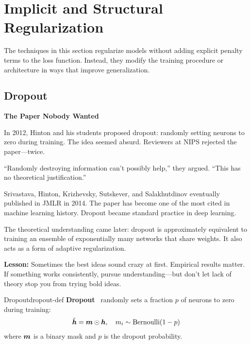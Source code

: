 \documentclass[../../main.tex]{subfiles}
\begin{document}
\section{Implicit and Structural Regularization}
\label{sec:implicit-structural}

The techniques in this section regularize models without adding explicit penalty terms to the loss function. Instead, they modify the training procedure or architecture in ways that improve generalization.

\subsection{Dropout}
\label{sec:dropout}

\begin{warstory}
\textbf{The Paper Nobody Wanted}

In 2012, Hinton and his students proposed dropout: randomly setting neurons to zero during training. The idea seemed absurd. Reviewers at NIPS rejected the paper---twice.

``Randomly destroying information can't possibly help,'' they argued. ``This has no theoretical justification.''

Srivastava, Hinton, Krizhevsky, Sutskever, and Salakhutdinov eventually published in JMLR in 2014. The paper has become one of the most cited in machine learning history. Dropout became standard practice in deep learning.

The theoretical understanding came later: dropout is approximately equivalent to training an ensemble of exponentially many networks that share weights. It also acts as a form of adaptive regularization.

\textbf{Lesson:} Sometimes the best ideas sound crazy at first. Empirical results matter. If something works consistently, pursue understanding---but don't let lack of theory stop you from trying bold ideas.
\end{warstory}

\begin{definition}{Dropout}{dropout-def}
\textbf{Dropout}~\cite{srivastava2014dropout} randomly sets a fraction $p$ of neurons to zero during training:
\[
    \tilde{\boldsymbol{h}} = \boldsymbol{m} \odot \boldsymbol{h}, \quad m_i \sim \text{Bernoulli}(1-p)
\]
where $\boldsymbol{m}$ is a binary mask and $p$ is the dropout probability.
\end{definition}
\end{document}
